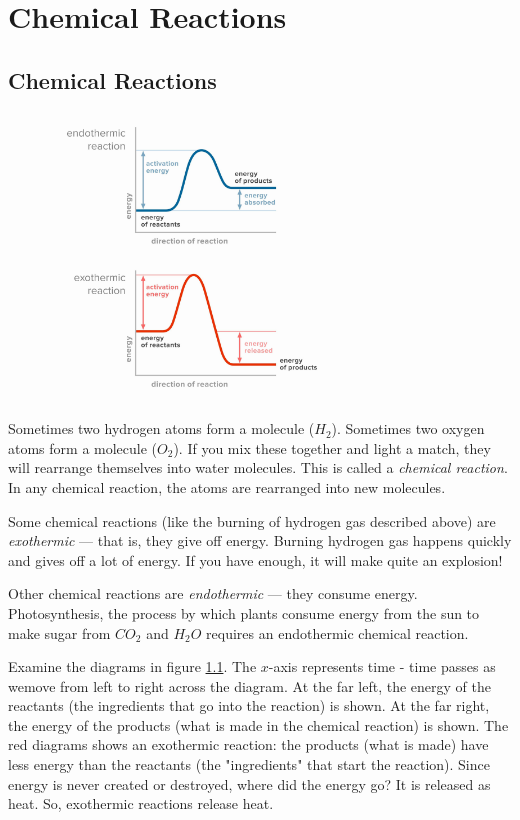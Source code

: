 \chapter{Chemical Reactions}

\section{Chemical Reactions}

\begin{figure}
\noindent\includegraphics[width=3in]{exo_endo_diagrams.png}
\caption{}
\label{fig:exo_endo_diagrams}
\end{figure}

Sometimes two hydrogen atoms form a molecule ($H_2$). Sometimes two oxygen
atoms form a molecule ($O_2$). If you mix these together and light a match,
they will rearrange themselves into water molecules. This is called a \textit{
chemical reaction}. In any chemical reaction, the atoms are rearranged into new
molecules.

Some chemical reactions (like the burning of hydrogen gas described above) are
\textit{exothermic} --- that is, they give off energy. Burning hydrogen gas
happens quickly and gives off a lot of energy. If you have enough, it will make
quite an explosion! 

Other chemical reactions are \textit{endothermic} --- they consume energy.
Photosynthesis, the process by which plants consume energy from the sun to make
sugar from $CO_2$ and $H_2O$ requires an endothermic chemical reaction.

Examine the diagrams in figure \ref{fig:exo_endo_diagrams}. The $x$-axis 
represents time - time passes as wemove from left to right across the diagram. 
At the far left, the energy of the reactants (the ingredients that go into the 
reaction) is shown. At the far right, the energy of the products (what is made in 
the chemical reaction) is shown. The red diagrams shows an exothermic reaction: 
the products (what is made) have less energy than the reactants (the "ingredients"
that start the reaction). Since energy is never created or destroyed, where did 
the energy go? It is released as heat. So, exothermic reactions release heat.

